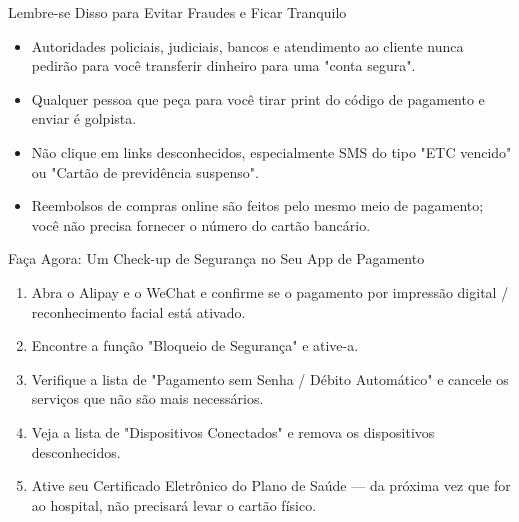 \begin{tcbwarn}{Lembre-se Disso para Evitar Fraudes e Ficar Tranquilo}
\begin{itemize}
  \item Autoridades policiais, judiciais, bancos e atendimento ao cliente nunca pedirão para você transferir dinheiro para uma "conta segura".
  \item Qualquer pessoa que peça para você tirar print do código de pagamento e enviar é golpista.
  \item Não clique em links desconhecidos, especialmente SMS do tipo "ETC vencido" ou "Cartão de previdência suspenso".
  \item Reembolsos de compras online são feitos pelo mesmo meio de pagamento; você não precisa fornecer o número do cartão bancário.
\end{itemize}

\end{tcbwarn}

\begin{tcbpractice}{Faça Agora: Um Check-up de Segurança no Seu App de Pagamento}
\begin{enumerate}
  \item Abra o Alipay e o WeChat e confirme se o pagamento por impressão digital / reconhecimento facial está ativado.
  \item Encontre a função "Bloqueio de Segurança" e ative-a.
  \item Verifique a lista de "Pagamento sem Senha / Débito Automático" e cancele os serviços que não são mais necessários.
  \item Veja a lista de "Dispositivos Conectados" e remova os dispositivos desconhecidos.
  \item Ative seu Certificado Eletrônico do Plano de Saúde — da próxima vez que for ao hospital, não precisará levar o cartão físico.
\end{enumerate}

\end{tcbpractice}
